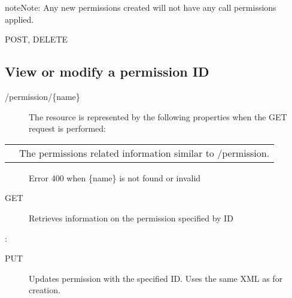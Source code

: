 \documentclass[letterpaper,10pt,english]{sphinxmanual}
\begin{document}
\begin{sphinxadmonition}{note}{Note:}
Any new permissions created will not have any call permissions applied.
\end{sphinxadmonition}

 POST, DELETE


\subsection{View or modify a permission ID}
\label{\detokenize{restapi:view-or-modify-a-permission-id}}
 /permission/\{name\}
\begin{description}
\item[{}] \leavevmode
The resource is represented by the following properties when the GET request is performed:

\end{description}


\begin{savenotes}\sphinxattablestart
\centering
\begin{tabulary}{\linewidth}[t]{|T|T|}
\hline

&
\\
\hline
{}
&
The permissions related information similar to /permission.
\\
\hline
\end{tabulary}
\par
\sphinxattableend\end{savenotes}
\begin{description}
\item[{}] \leavevmode
Error 400 when \{name\} is not found or invalid

\item[{ GET}] \leavevmode
Retrieves information on the permission specified by ID

\end{description}

:

\begin{sphinxVerbatim}[commandchars=\\\{\}]
\end{sphinxVerbatim}
\begin{description}
\item[{ PUT}] \leavevmode
Updates permission with the specified ID. Uses the same XML as for creation.

\end{description}
\end{document}
